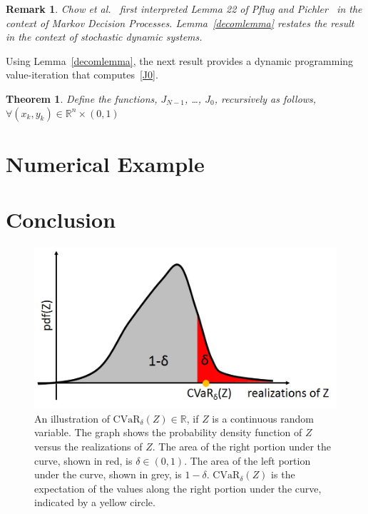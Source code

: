 \documentclass[letterpaper, 10 pt, conference]{ieeeconf}  %
\newtheorem{theorem}{Theorem}
\newtheorem{remark}{Remark}
\begin{document}
\begin{remark}
Chow et al.~\cite{chow2015risk} first interpreted Lemma 22 of Pflug and Pichler~\cite{pflug2016time} 
in the context of Markov Decision Processes.
Lemma~\ref{decomlemma} restates the result in the context of stochastic dynamic systems.
\end{remark}
Using Lemma~\ref{decomlemma}, the next result provides a dynamic programming value-iteration that computes~\eqref{J0}.
\begin{theorem}
Define the functions, $J_{N-1}$, \dots, $J_0$, recursively as follows, $\forall (x_k, y_k) \in \mathbb{R}^n \times (0,1)$
\end{theorem}



\section{Numerical Example}\label{ex}

\section{Conclusion}\label{conc}


\begin{figure}[thpb]
      \centering
      \includegraphics[scale=0.5]{cvar.jpg}
      \caption{An illustration of $\text{CVaR}_\delta(Z) \in \mathbb{R}$, if $Z$ is a continuous random variable. 
	  The graph shows the probability density function of $Z$ versus the realizations of $Z$.
	  The area of the right portion under the curve, shown in red, is $\delta \in (0,1)$.	  
	  The area of the left portion under the curve, shown in grey, is $1-\delta$.
	  $\text{CVaR}_\delta(Z)$ is the expectation of the values along the right portion under the curve, indicated by a yellow circle.}
      \label{cvar}
\end{figure}
\end{document}

